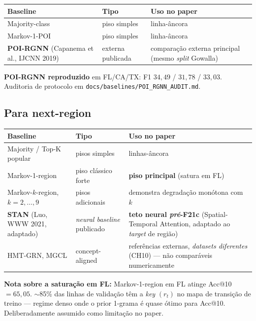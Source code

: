 \documentclass[11pt,a4paper]{article}
\begin{document}
\begin{table}[H]
\centering
\small
\begin{tabular}{lll}
\toprule
\textbf{Baseline} & \textbf{Tipo} & \textbf{Uso no paper} \\
\midrule
Majority-class & piso simples & linha-âncora \\
Markov-1-POI & piso simples & linha-âncora \\
\textbf{POI-RGNN} (Capanema et al., IJCNN 2019) & externa publicada & comparação externa principal (mesmo \textit{split} Gowalla) \\
\bottomrule
\end{tabular}
\end{table}

\noindent\textbf{POI-RGNN reproduzido} em FL/CA/TX: F1 $34{,}49$ / $31{,}78$ / $33{,}03$. Auditoria de protocolo em \texttt{docs/baselines/POI\_RGNN\_AUDIT.md}.

\subsection{Para next-region}

\begin{table}[H]
\centering
\small
\begin{tabular}{lll}
\toprule
\textbf{Baseline} & \textbf{Tipo} & \textbf{Uso no paper} \\
\midrule
Majority / Top-K popular & pisos simples & linhas-âncora \\
Markov-1-region & piso clássico forte & \textbf{piso principal} (satura em FL) \\
Markov-$k$-region, $k=2,\dots,9$ & pisos adicionais & demonstra degradação monótona com $k$ \\
\textbf{STAN} (Luo, WWW 2021, adaptado) & \textit{neural baseline} publicado & \textbf{teto neural \textit{pré}-F21c} (Spatial-Temporal Attention, adaptado ao \textit{target} de região) \\
HMT-GRN, MGCL & concept-aligned & referências externas, \emph{datasets diferentes} (CH10) --- não comparáveis numericamente \\
\bottomrule
\end{tabular}
\end{table}

\textbf{Nota sobre a saturação em FL:} Markov-1-region em FL atinge Acc@10 $= 65{,}05$. $\sim$85\% das linhas de validação têm a \textit{key} $(r_t)$ no mapa de transição de treino --- regime denso onde o prior 1-grama é quase ótimo para Acc@10. Deliberadamente assumido como limitação no paper.
\end{document}
